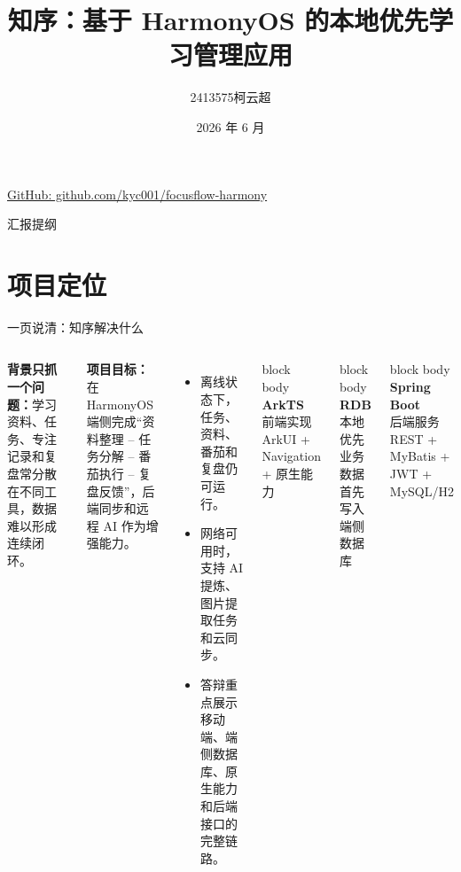\documentclass{beamer}
\title[知序答辩]{知序：基于 HarmonyOS 的本地优先学习管理应用}
\author[2413575 柯云超]{2413575\quad 柯云超}
\institute[南开大学]{南开大学计算机学院\\移动应用开发课程设计答辩}
\date{2026 年 6 月}
\newcommand{\metric}[3]{%
  \begin{beamercolorbox}[wd=\linewidth,sep=0.65em,rounded=true,center]{block body}
    {\Large\bfseries\color{accentLine}#1}\\[-0.2em]
    {\small\color{muted}#2}\\[-0.1em]
    {\scriptsize #3}
  \end{beamercolorbox}
}
\begin{document}
\begin{frame}
  \titlepage
  \vspace{-1.0em}
  \begin{center}
    {\small\color{muted}\href{https://github.com/kyc001/focusflow-harmony}{GitHub: github.com/kyc001/focusflow-harmony}}
  \end{center}
\end{frame}

\begin{frame}{汇报提纲}
  \tableofcontents
\end{frame}

\section{项目定位}
\begin{frame}{一页说清：知序解决什么}
  \begin{columns}[T,onlytextwidth]
      \textbf{背景只抓一个问题：}学习资料、任务、专注记录和复盘常分散在不同工具，数据难以形成连续闭环。

      \vspace{0.7em}
      \textbf{项目目标：}在 HarmonyOS 端侧完成“资料整理 -- 任务分解 -- 番茄执行 -- 复盘反馈”，后端同步和远程 AI 作为增强能力。

      \vspace{0.7em}
      \begin{itemize}
        \item 离线状态下，任务、资料、番茄和复盘仍可运行。
        \item 网络可用时，支持 AI 提炼、图片提取任务和云同步。
        \item 答辩重点展示移动端、端侧数据库、原生能力和后端接口的完整链路。
      \end{itemize}
      \metric{ArkTS}{前端实现}{ArkUI + Navigation + 原生能力}
      \vspace{0.45em}
      \metric{RDB}{本地优先}{业务数据首先写入端侧数据库}
      \vspace{0.45em}
      \metric{Spring Boot}{后端服务}{REST + MyBatis + JWT + MySQL/H2}
  \end{columns}
\end{frame}
\end{document}
